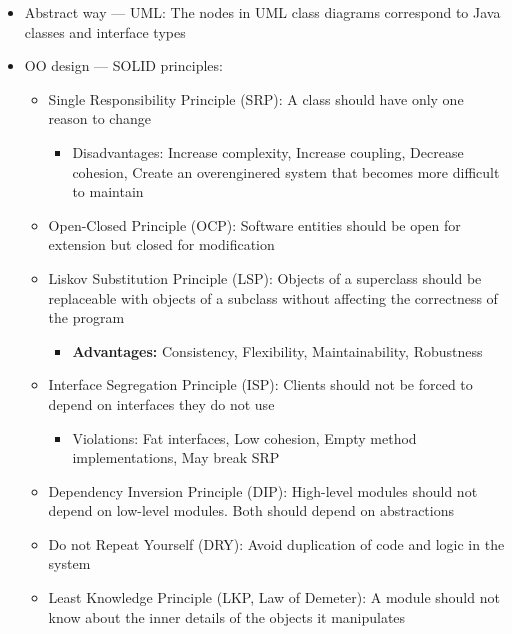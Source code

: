 \documentclass[12pt,openany]{book}
\begin{document}
\begin{itemize}
    \item Abstract way --- UML: The nodes in UML class diagrams correspond to Java classes and interface types
    \item OO design --- SOLID principles:
    \begin{itemize}
        \item Single Responsibility Principle (SRP): A class should have only one reason to change
        \begin{itemize}
            \item Disadvantages: Increase complexity, Increase coupling, Decrease cohesion, Create an overenginered system that becomes more difficult to maintain
        \end{itemize}
        \item Open-Closed Principle (OCP): Software entities should be open for extension but closed for modification
        \item Liskov Substitution Principle (LSP): Objects of a superclass should be replaceable with objects of a subclass without affecting the correctness of the program
        \begin{itemize}
            \item \textbf{Advantages:} Consistency, Flexibility, Maintainability, Robustness
        \end{itemize}
        \item Interface Segregation Principle (ISP): Clients should not be forced to depend on interfaces they do not use
        \begin{itemize}
            \item Violations: Fat interfaces, Low cohesion, Empty method implementations, May break SRP
        \end{itemize}
        \item Dependency Inversion Principle (DIP): High-level modules should not depend on low-level modules. Both should depend on abstractions
        \item Do not Repeat Yourself (DRY): Avoid duplication of code and logic in the system
        \item Least Knowledge Principle (LKP, Law of Demeter): A module should not know about the inner details of the objects it manipulates
    \end{itemize}
\end{itemize}

\end{document}

